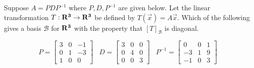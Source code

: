 \documentclass{ximera}
\newcommand{\RR}{\bf R}
\begin{document}
  	  		      	   	   \begin{question} Suppose $A = PDP^{-1}$ where $P,D, P^{-1}$ are given below. Let the linear transformation $T:\RR^3 \to \RR^3$ be defined by $T(\vec{x}) = A\vec{x}$. Which of the following gives a basis $\mathcal{B}$ for $\RR^3$ with the property that $[T]_\mathcal{B}$ is diagonal.
  	  		      	   	   	
  	  		      	   	   	$$P = \begin{bmatrix} 3 & 0 &-1\\ 0& 1&-3 \\1&0&0\end{bmatrix} \hspace{10pt} 
  	  		      	   	   	D = \begin{bmatrix} 3 & 0 &0\\ 0& 4&0 \\0&0&3\end{bmatrix} \hspace{10pt} 
  	  		      	   	   P^{-1} =	\begin{bmatrix} 0 & 0 &1\\ -3& 1&9 \\-1&0&3\end{bmatrix} $$
  	  		      	   	   	
  	  		      	   	   	\begin{multipleChoice}
  	  		      	   	 

\end{multipleChoice}
\end{question}
\end{document}
